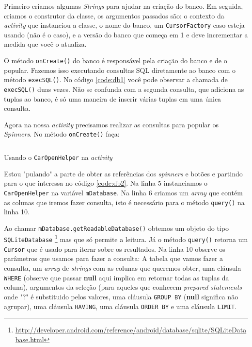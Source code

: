\documentclass[a4paper,12pt,brazil]{book}
\begin{document}
\begin{singlespace}
		Primeiro criamos algumas \emph{Strings} para ajudar na criação do banco. Em seguida, criamos o construtor da classe, os argumentos passados são: o contexto da \emph{activity} que instanciou a classe, o nome do banco, um \texttt{CursorFactory} caso esteja usando (não é o caso), e a versão do banco que começa em 1 e deve incrementar a medida que você o atualiza. 
		
		O método \texttt{onCreate()} do banco é responsável pela criação do banco e de o popular. Fazemos isso executando consultas SQL diretamente ao banco com o método \texttt{execSQL()}. No código \ref{code:db1} você pode observar a chamada de \texttt{execSQL()} duas vezes. Não se confunda com a segunda consulta, que adiciona as tuplas ao banco, é só uma maneira de inserir várias tuplas em uma única consulta.

		Agora na nossa \emph{activity} precisamos realizar as consultas para popular os \emph{Spinners}. No método \texttt{onCreate()} faça: 

		\begin{listing}[H]
		\inputminted[linenos=true,fontsize=\small,frame=lines, framesep=2mm, tabsize=2,numbersep=5pt]{java}{src/api/storage/db2.java}
		\caption{Usando o \texttt{CarOpenHelper} na \emph{activity}}
		\label{code:db2}
		\end{listing} 	

		Estou "pulando" a parte de obter as referências dos \emph{spinners} e botões e partindo para o que interessa no código \ref{code:db2}. Na linha 5 instanciamos o \texttt{CarOpenHelper} na variável \texttt{mDatabase}. Na linha 6 criamos um \emph{array} que contém as colunas que iremos fazer consulta, isto é necessário para o método \texttt{query()} na linha 10.

		Ao chamar \texttt{mDatabase.getReadableDatabase()} obtemos um objeto do tipo \texttt{SQLiteDatabase}
\footnote{\href{http://developer.android.com/reference/android/database/sqlite/SQLiteDatabase.html}{http://developer.android.com/reference/android/database/sqlite/SQLiteDatabase.html}}
 mas que só permite a leitura. Já o método \texttt{query()} retorna um \texttt{Cursor} que é usado para iterar sobre os resultados. Na linha 10 observe os parâmetros que usamos para fazer a consulta: A tabela que vamos fazer a consulta, um \emph{array} de \emph{strings} com as colunas que queremos obter,  uma cláusula \texttt{WHERE} (observe que passar \textbf{null} aqui implica em retornar todas as tuplas da coluna), argumentos da seleção (para aqueles que conhecem \emph{prepared statements} onde "?" é substituido pelos valores, uma cláusula \texttt{GROUP BY} (\textbf{null} significa não agrupar), uma cláusula \texttt{HAVING}, uma cláusula \texttt{ORDER BY} e uma cláusula \texttt{LIMIT}.


\end{singlespace}
\end{document}
